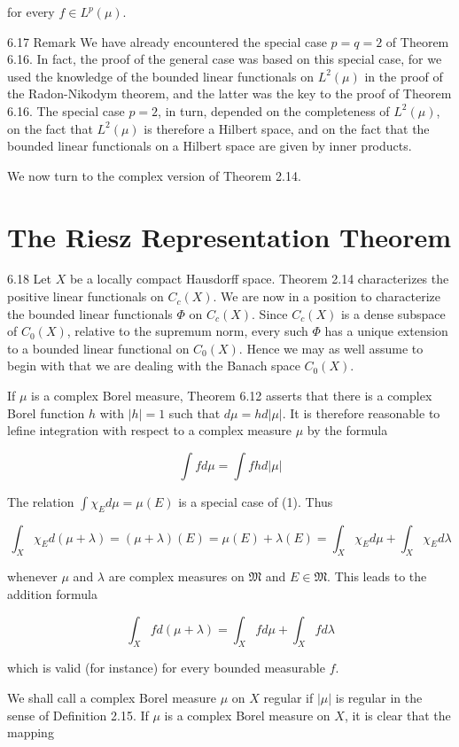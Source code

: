 \documentclass[10pt]{article}
\begin{document}
for every $f \in L^{p}(\mu)$.

6.17 Remark We have already encountered the special case $p=q=2$ of Theorem 6.16. In fact, the proof of the general case was based on this special case, for we used the knowledge of the bounded linear functionals on $L^{2}(\mu)$ in the proof of the Radon-Nikodym theorem, and the latter was the key to the proof of Theorem 6.16. The special case $p=2$, in turn, depended on the completeness of $L^{2}(\mu)$, on the fact that $L^{2}(\mu)$ is therefore a Hilbert space, and on the fact that the bounded linear functionals on a Hilbert space are given by inner products.

We now turn to the complex version of Theorem 2.14.

\section{The Riesz Representation Theorem}
6.18 Let $X$ be a locally compact Hausdorff space. Theorem 2.14 characterizes the positive linear functionals on $C_{c}(X)$. We are now in a position to characterize the bounded linear functionals $\Phi$ on $C_{c}(X)$. Since $C_{c}(X)$ is a dense subspace of $C_{0}(X)$, relative to the supremum norm, every such $\Phi$ has a unique extension to a bounded linear functional on $C_{0}(X)$. Hence we may as well assume to begin with that we are dealing with the Banach space $C_{0}(X)$.

If $\mu$ is a complex Borel measure, Theorem 6.12 asserts that there is a complex Borel function $h$ with $|h|=1$ such that $d \mu=h d|\mu|$. It is therefore reasonable to lefine integration with respect to a complex measure $\mu$ by the formula

$$
\int f d \mu=\int f h d|\mu|
$$

The relation $\int \chi_{E} d \mu=\mu(E)$ is a special case of (1). Thus

$$
\int_{X} \chi_{E} d(\mu+\lambda)=(\mu+\lambda)(E)=\mu(E)+\lambda(E)=\int_{X} \chi_{E} d \mu+\int_{X} \chi_{E} d \lambda
$$

whenever $\mu$ and $\lambda$ are complex measures on $\mathfrak{M}$ and $E \in \mathfrak{M}$. This leads to the addition formula

$$
\int_{X} f d(\mu+\lambda)=\int_{X} f d \mu+\int_{X} f d \lambda
$$

which is valid (for instance) for every bounded measurable $f$.

We shall call a complex Borel measure $\mu$ on $X$ regular if $|\mu|$ is regular in the sense of Definition 2.15. If $\mu$ is a complex Borel measure on $X$, it is clear that the mapping
\end{document}
